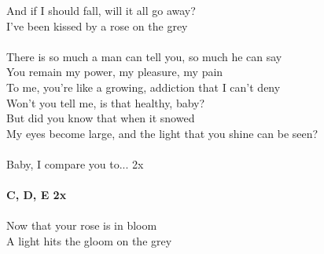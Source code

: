And if I should fall, will it all go away?\\
I've been kissed by a rose on the grey\\
\\
There is so much a man can tell you, so much he can say\\
You remain my power, my pleasure, my pain\\
To me, you're like a growing, addiction that I can't deny\\
Won't you tell me, is that healthy, baby?\\
But did you know that when it snowed\\
My eyes become large, and the light that you shine can be seen?\\
\\
Baby, I compare you to... 2x\\
\\
\footnotesize\textbf{C, D, E 2x}\\
\\
\normalsize
Now that your rose is in bloom\\
A light hits the gloom on the grey\\